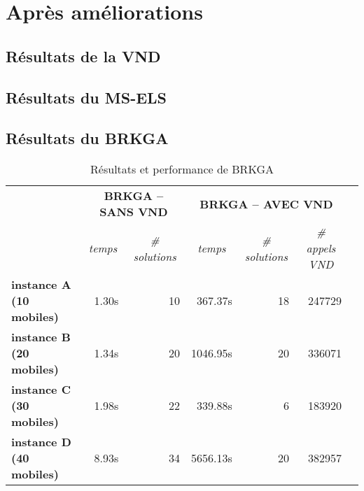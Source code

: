    \section{Après améliorations}
    	\subsection{Résultats de la VND}
    	\subsection{Résultats du MS-ELS}
    	\subsection{Résultats du BRKGA}

            \begin{table}[H]
                \centering
                \begin{tabular}{r|r|r|r|r|r|l}
                \cline{2-6}
                \multicolumn{1}{l|}{\multirow{2}{*}{}}                 & \multicolumn{2}{c|}{\textbf{BRKGA -- SANS VND}}                                  & \multicolumn{3}{c|}{\textbf{BRKGA -- AVEC VND}}                                                                                &  \\ \cline{2-6}
                \multicolumn{1}{l|}{}                                  & \multicolumn{1}{c|}{\textit{temps}} & \multicolumn{1}{c|}{\textit{\# solutions}} & \multicolumn{1}{c|}{\textit{temps}} & \multicolumn{1}{c|}{\textit{\# solutions}} & \multicolumn{1}{c|}{\textit{\# appels VND}} &  \\ \cline{1-6}
                \multicolumn{1}{|l|}{\textbf{instance A (10 mobiles)}} & 1.30s                               & 10                                         & 367.37s                             & 18                                         & 247729                                      &  \\ \cline{1-6}
                \multicolumn{1}{|l|}{\textbf{instance B (20 mobiles)}} & 1.34s                               & 20                                         & 1046.95s                            & 20                                         & 336071                                      &  \\ \cline{1-6}
                \multicolumn{1}{|l|}{\textbf{instance C (30 mobiles)}} & 1.98s                               & 22                                         & 339.88s                             & 6                                          & 183920                                      &  \\ \cline{1-6}
                \multicolumn{1}{|l|}{\textbf{instance D (40 mobiles)}} & 8.93s                               & 34                                         & 5656.13s                            & 20                                         & 382957                                      &  \\ \cline{1-6}
                \end{tabular}
                \caption{Résultats et performance de BRKGA}
                \label{tab:brkga}
            \end{table}
